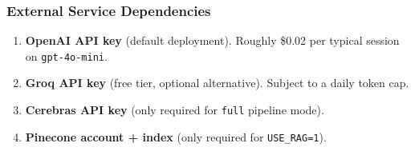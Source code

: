 \documentclass{article}
\begin{document}
\subsubsection{External Service Dependencies}
\begin{enumerate}[label=\alph*.]
    \item \textbf{OpenAI API key} (default deployment). Roughly \$0.02 per typical session on \texttt{gpt-4o-mini}.
    \item \textbf{Groq API key} (free tier, optional alternative). Subject to a daily token cap.
    \item \textbf{Cerebras API key} (only required for \texttt{full} pipeline mode).
    \item \textbf{Pinecone account + index} (only required for \texttt{USE\_RAG=1}).
\end{enumerate}

\newpage
\nocite{*}


\end{document}
